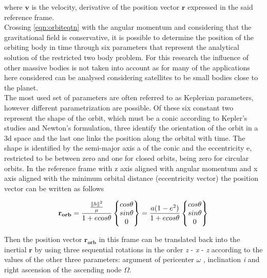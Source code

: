 where $\mathbf{v}$ is the velocity, derivative of the position vector $\mathbf{r}$ expressed in the said reference frame.\\
Crossing \ref{eqn:orbiteqtn} with the angular momentum and considering that the gravitational field is conservative, it is possible to determine the position of the orbiting body in time through six parameters that represent the analytical solution of the restricted two body problem. For this research the influence of other massive bodies is not taken into account as for many of the applications here considered can be analysed considering satellites to be small bodies close to the planet.\\
The most used set of parameters are often referred to as Keplerian parameters, however different parametrization are possible. Of these six constant two represent the shape of the orbit, which must be a conic according to Kepler's studies and Newton's formulation, three identify the orientation of the orbit in a \acrshort{3d} space and the last one links the position along the orbital with time. The shape is identified by the semi-major axis a of the conic and the eccentricity e, restricted to be between zero and one for closed orbits, being zero for circular orbits. In the reference frame with z axis aligned with angular momentum and x axis aligned with the minimum orbital distance (eccentricity vector) the position vector can be written as follows

\begin{equation}
\mathbf{r_{orb}} = \frac{\frac{\left\lVert h\right\rVert^2}{\mu}}{1 + e cos \theta} \begin{Bmatrix} cos \theta
\\ sin \theta
\\ 0
\end{Bmatrix} = \frac{a(1-e^2)}{1+ e cos \theta} \begin{Bmatrix} cos \theta
\\ sin \theta
\\ 0
\end{Bmatrix}
\end{equation}

Then the position vector $\mathbf{r_{orb}}$ in this frame can be translated back into the inertial $\mathbf{r}$ by using three sequential rotations in the order \textit{z} - \textit{x} - \textit{z} according to the values of the other three parameters: argument of pericenter $\omega$ , inclination \textit{i} and right ascension of the ascending node $\Omega$.



